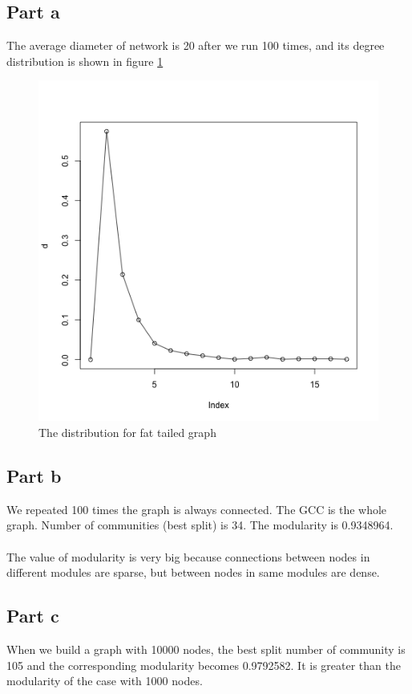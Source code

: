 \documentclass{article}
\begin{document}
\subsection{Part a}
The average diameter of network is 20 after we run 100 times, and its degree distribution is shown in figure \ref{fig:p2_1}
\begin{figure}[htbp]
\centering
\includegraphics[width=.6\textwidth]{p2_1.png}
\caption{The distribution for fat tailed graph}
\label{fig:p2_1}
\end{figure}

\subsection{Part b}
We repeated 100 times the graph is always connected.
The GCC is the whole graph.
Number of communities (best split) is 34.
The modularity is 0.9348964.\\
\\
The value of modularity is very big because connections between nodes in different modules are sparse, but between nodes in same modules are dense. 
\subsection{Part c}
When we build a graph with 10000 nodes, the best split number of community is 105 and the corresponding modularity becomes 0.9792582.
It is greater than the modularity of the case with 1000 nodes.
\end{document}
